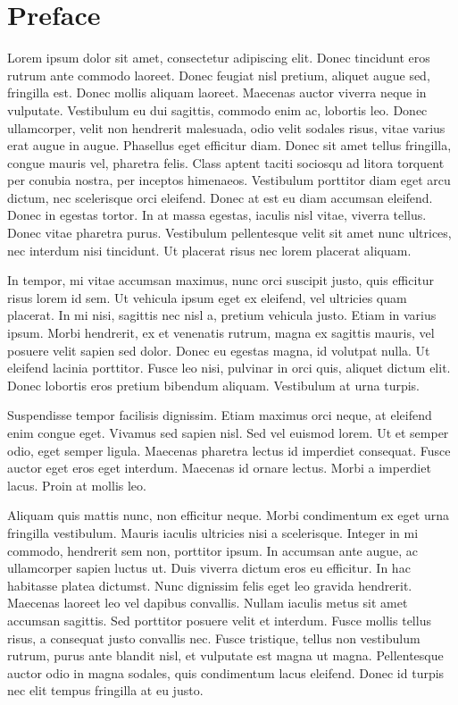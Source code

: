 \section*{Preface}



Lorem ipsum dolor sit amet, consectetur adipiscing elit. Donec tincidunt eros rutrum ante commodo laoreet. Donec feugiat nisl pretium, aliquet augue sed, fringilla est. Donec mollis aliquam laoreet. Maecenas auctor viverra neque in vulputate. Vestibulum eu dui sagittis, commodo enim ac, lobortis leo. Donec ullamcorper, velit non hendrerit malesuada, odio velit sodales risus, vitae varius erat augue in augue. Phasellus eget efficitur diam. Donec sit amet tellus fringilla, congue mauris vel, pharetra felis. Class aptent taciti sociosqu ad litora torquent per conubia nostra, per inceptos himenaeos. Vestibulum porttitor diam eget arcu dictum, nec scelerisque orci eleifend. Donec at est eu diam accumsan eleifend. Donec in egestas tortor. In at massa egestas, iaculis nisl vitae, viverra tellus. Donec vitae pharetra purus. Vestibulum pellentesque velit sit amet nunc ultrices, nec interdum nisi tincidunt. Ut placerat risus nec lorem placerat aliquam.

In tempor, mi vitae accumsan maximus, nunc orci suscipit justo, quis efficitur risus lorem id sem. Ut vehicula ipsum eget ex eleifend, vel ultricies quam placerat. In mi nisi, sagittis nec nisl a, pretium vehicula justo. Etiam in varius ipsum. Morbi hendrerit, ex et venenatis rutrum, magna ex sagittis mauris, vel posuere velit sapien sed dolor. Donec eu egestas magna, id volutpat nulla. Ut eleifend lacinia porttitor. Fusce leo nisi, pulvinar in orci quis, aliquet dictum elit. Donec lobortis eros pretium bibendum aliquam. Vestibulum at urna turpis.

Suspendisse tempor facilisis dignissim. Etiam maximus orci neque, at eleifend enim congue eget. Vivamus sed sapien nisl. Sed vel euismod lorem. Ut et semper odio, eget semper ligula. Maecenas pharetra lectus id imperdiet consequat. Fusce auctor eget eros eget interdum. Maecenas id ornare lectus. Morbi a imperdiet lacus. Proin at mollis leo.

Aliquam quis mattis nunc, non efficitur neque. Morbi condimentum ex eget urna fringilla vestibulum. Mauris iaculis ultricies nisi a scelerisque. Integer in mi commodo, hendrerit sem non, porttitor ipsum. In accumsan ante augue, ac ullamcorper sapien luctus ut. Duis viverra dictum eros eu efficitur. In hac habitasse platea dictumst. Nunc dignissim felis eget leo gravida hendrerit. Maecenas laoreet leo vel dapibus convallis. Nullam iaculis metus sit amet accumsan sagittis. Sed porttitor posuere velit et interdum. Fusce mollis tellus risus, a consequat justo convallis nec. Fusce tristique, tellus non vestibulum rutrum, purus ante blandit nisl, et vulputate est magna ut magna. Pellentesque auctor odio in magna sodales, quis condimentum lacus eleifend. Donec id turpis nec elit tempus fringilla at eu justo.

